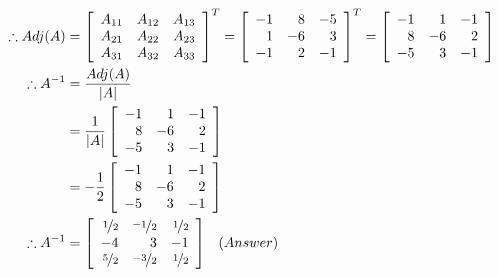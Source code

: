 \begin{align*}
	\therefore Adj(A) &= \left[\begin{array}{ccc}
		A_{11} & A_{12} & A_{13} \\
		A_{21} & A_{22} & A_{23} \\
		A_{31} & A_{32} & A_{33} 
	\end{array}\right]^T=\left[\begin{array}{rrr}
		-1 & 8 & -5 \\
		1 & -6 & 3 \\
		-1 & 2 & -1
	\end{array}\right]^T=\left[\begin{array}{rrr}
		-1 & 1 & -1 \\
		8 & -6 & 2 \\
		-5 & 3 & -1
	\end{array}\right] \\
	\therefore A^{-1} &= \dfrac{Adj(A)}{|A|} \\
	&= \dfrac{1}{|A|}\left[\begin{array}{rrr}
	-1 & 1 & -1 \\
	8 & -6 & 2 \\
	-5 & 3 & -1
	\end{array}\right] \\
	&= -\dfrac{1}{2}\left[\begin{array}{rrr}
	-1 & 1 & -1 \\
	8 & -6 & 2 \\
	-5 & 3 & -1
	\end{array}\right]\\
	\therefore A^{-1} &=\left[\begin{array}{rrr}
	\nicefrac{1}{2} & \nicefrac{-1}{2} & \nicefrac{1}{2} \\
	-4 & 3 & -1 \\
	\nicefrac{5}{2} & \nicefrac{-3}{2} & \nicefrac{1}{2}
	\end{array}\right] \hspace{8pt} (Answer)
\end{align*}

\newpage
